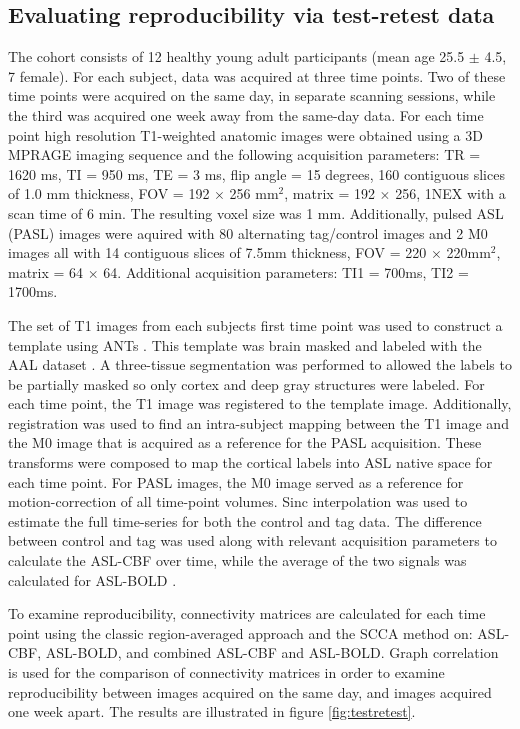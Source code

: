 \documentclass{llncs}
\begin{document}
\subsection{Evaluating reproducibility via test-retest data}
 The cohort consists of 12 healthy young adult participants  (mean age 25.5 $\pm$ 4.5, 7 female). For each subject, data was acquired at three time points. Two of these time points were acquired on the same day, in separate scanning sessions, while the third was acquired one week away from the same-day data.  For each time point high resolution T1-weighted anatomic images were obtained using a 3D MPRAGE imaging sequence and the following acquisition parameters: TR = 1620 ms, TI = 950 ms, TE = 3 ms, flip angle = 15 degrees, 160 contiguous slices of 1.0 mm thickness, FOV = 192 $\times$ 256 mm$^2$, matrix = 192 $\times$ 256, 1NEX with a scan time of 6 min. The resulting voxel size was 1 mm.  Additionally, pulsed ASL (PASL) images were aquired with 80 alternating tag/control images and 2 M0 images all with 14 contiguous slices of 7.5mm thickness, FOV = 220 $\times$ 220mm$^2$, matrix = 64 $\times$ 64. Additional acquisition parameters: TI1 = 700ms, TI2 = 1700ms.

 The set of T1 images from each subjects first time point was used to construct a template using ANTs \cite{Avants2011}. This template was brain masked and labeled with the AAL dataset \cite{Tzourio-Mazoyer2002}. A three-tissue segmentation was performed to allowed the labels to be partially masked so only cortex and deep gray structures were labeled. For each time point, the T1 image was registered to the template image. Additionally, registration was used to find an intra-subject mapping between the T1 image and the M0 image that is acquired as a reference for the PASL acquisition. These transforms were composed to map the cortical labels into ASL native space for each time point. For PASL images, the M0 image served as a reference for motion-correction of all time-point volumes. Sinc interpolation was used to estimate the full time-series for both the control and tag data. The difference between control and tag was used along with relevant acquisition parameters to calculate the ASL-CBF over time, while the average of the two signals was calculated for ASL-BOLD \cite{Wong1997}. 

 To examine reproducibility, connectivity matrices are calculated for each time point using the classic region-averaged approach and the SCCA method on: ASL-CBF, ASL-BOLD, and combined ASL-CBF and ASL-BOLD. Graph correlation \cite{vanWijk2010} is used for the comparison of connectivity matrices in order to examine reproducibility between images acquired on the same day, and images acquired one week apart. The results are illustrated in figure \ref{fig:testretest}.
\end{document}
